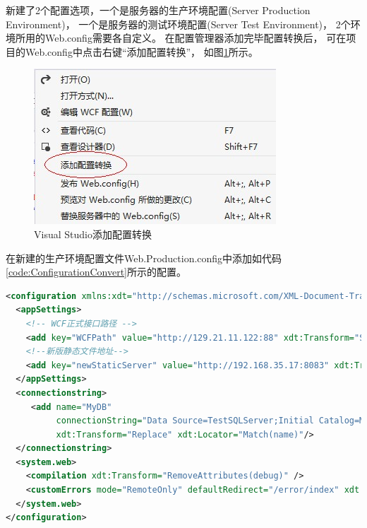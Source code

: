 \documentclass{book}
\newcounter{coderemarks}   %
\newcommand{\circlemark}[1]{%
\tikz\node[text=white,font=\sffamily\bfseries,inner sep=0.2mm,draw,circle,fill=black]{#1};}
\newcommand{\makeremark}[1]{%
\circlemark{\arabic{coderemarks}}%
\global \expandafter\def \csname codebox\the\value{coderemarks}\endcsname{#1}%
\stepcounter{coderemarks}}
\begin{document}
新建了2个配置选项，一个是服务器的生产环境配置(Server Production Environment)，
一个是服务器的测试环境配置(Server Test Environment)，
2个环境所用的Web.config需要各自定义。
在配置管理器添加完毕配置转换后，
可在项目的Web.config中点击右键“添加配置转换”，
如图\ref{fig:VisualStudioAddConfigurationConvert}所示。

\begin{figure}[htbp]
	\centering
	\includegraphics[scale=0.6]{VisualStudioAddConfigurationConvert.jpg}
	\caption{Visual Studio添加配置转换}
	\label{fig:VisualStudioAddConfigurationConvert}
\end{figure}

在新建的生产环境配置文件Web.Production.config中添加如代码\ref{code:ConfigurationConvert}所示的配置。

\begin{lstlisting}[language=XML,caption=配置文件转换,label={code:ConfigurationConvert}]
<configuration xmlns:xdt="http://schemas.microsoft.com/XML-Document-Transform">
  <appSettings>
    <!-- WCF正式接口路径 -->
    <add key="WCFPath" value="http://129.21.11.122:88" xdt:Transform="SetAttributes" xdt:Locator="Match(key)"/>`\makeremark{设置（SetAttributes）生产环境所调用的接口的值，根据key进行匹配（Match(key)）}`
    <!--新版静态文件地址-->
    <add key="newStaticServer" value="http://192.168.35.17:8083" xdt:Transform="SetAttributes" xdt:Locator="Match(key)"/>
  </appSettings>
  <connectionstring>
     <add name="MyDB"
          connectionString="Data Source=TestSQLServer;Initial Catalog=MyTestDB;Integrated Security=True"
          xdt:Transform="Replace" xdt:Locator="Match(name)"/>
  </connectionstring>
  <system.web>
    <compilation xdt:Transform="RemoveAttributes(debug)" />
    <customErrors mode="RemoteOnly" defaultRedirect="/error/index" xdt:Transform="Replace"/>`\makeremark{生产环境中只允许在主机上查看错误信息，避免将错误信息暴露给客户端，此处替换customErrors中model的值，不管在调试环境中的值如何设定，发布后统一设定为RemoteOnly}`
  </system.web>
</configuration>
\end{lstlisting}
\end{document}
